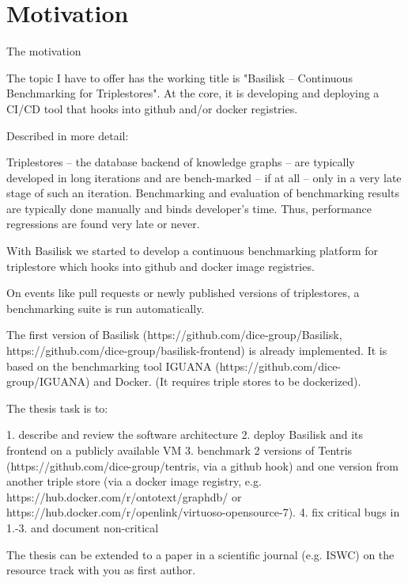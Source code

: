 \chapter{Motivation}
\label{ch:motivation}

The motivation

The topic I have to offer has the working title is "Basilisk -- Continuous Benchmarking for Triplestores". At the core, it is developing and deploying a CI/CD tool that hooks into github and/or docker registries.

Described in more detail:

Triplestores -- the database backend of knowledge graphs -- are
typically developed in long iterations and are bench-marked -- if at
all -- only in a very late stage of such an iteration. Benchmarking
and evaluation of benchmarking results are typically done manually
and binds developer's time. Thus, performance regressions are found
very late or never.

With Basilisk we started to develop a continuous benchmarking
platform for triplestore which hooks into github and docker image
registries.

On events like pull requests or newly published versions of
triplestores, a benchmarking suite is run automatically.

The first version of Basilisk
(https://github.com/dice-group/Basilisk,
https://github.com/dice-group/basilisk-frontend) is already
implemented. It is based on the benchmarking tool IGUANA
(https://github.com/dice-group/IGUANA) and Docker. (It requires
triple stores to be dockerized).

The thesis task is to:

1. describe and review the software architecture
2. deploy Basilisk and its frontend on a publicly available VM
3. benchmark 2 versions of Tentris
(https://github.com/dice-group/tentris, via a github hook) and
one version from another triple store (via a docker image
registry, e.g. https://hub.docker.com/r/ontotext/graphdb/ or
https://hub.docker.com/r/openlink/virtuoso-opensource-7).
4. fix critical bugs in 1.-3. and document non-critical

The thesis can be extended to a paper in a scientific journal (e.g.
ISWC) on the resource track with you as first author. 